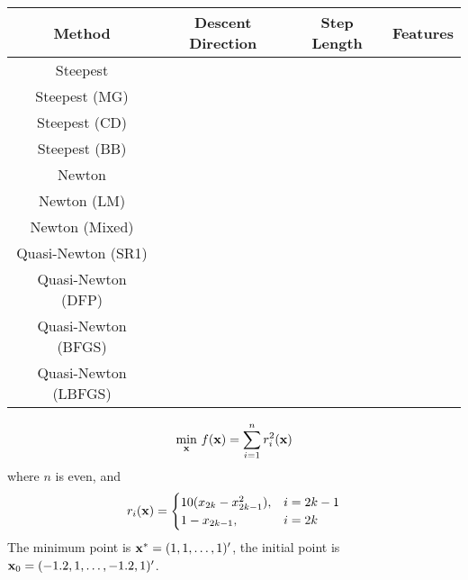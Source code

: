 \begin{table}[htbp]
	\centering
	\begin{tabular}{cccc}
		\toprule
		Method & Descent Direction & Step Length & Features \\
		\midrule
		Steepest                                            \\
		Steepest (MG)                                       \\
		Steepest (CD)                                       \\
		Steepest (BB)                                       \\
		\midrule
		Newton                                              \\
		Newton (LM)                                         \\
		Newton (Mixed)                                      \\
		\midrule
		Quasi-Newton (SR1)                                  \\
		Quasi-Newton (DFP)                                  \\
		Quasi-Newton (BFGS)                                 \\
		Quasi-Newton (LBFGS)                                \\
		\bottomrule
	\end{tabular}
\end{table}

\begin{example}
	\begin{equation}
		\min_{{\bf x}}\,f({\bf x})=\sum_{i=1}^{n}r_{i}^{2}({\bf x})
	\end{equation}
	where $n$ is even, and
	\begin{equation}
		r_{i}({\bf x})=\begin{cases}
			10(x_{2k}-x_{2k-1}^{2}), & i=2k-1 \\
			1-x_{2k-1},              & i=2k   \\
		\end{cases}
	\end{equation}
	The minimum point is ${\bf x}^{*}=(1,1,\ldots,1)^{\prime}$, the initial point is ${\bf x}_{0}=(-1.2,1,\ldots,-1.2,1)^{\prime}$.
\end{example}
